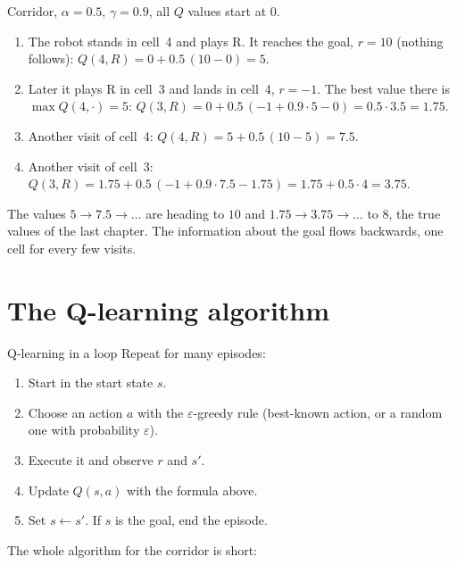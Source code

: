 \begin{example}
Corridor, $\alpha=0.5$, $\gamma=0.9$, all $Q$ values start at $0$.
\begin{enumerate}[nosep]
  \item The robot stands in cell~4 and plays R. It reaches the goal, $r=10$ (nothing follows): $Q(4,R)=0+0.5\,(10-0)=5$.
  \item Later it plays R in cell~3 and lands in cell~4, $r=-1$. The best value there is $\max Q(4,\cdot)=5$: $Q(3,R)=0+0.5\,(-1+0.9\cdot5-0)=0.5\cdot3.5=1.75$.
  \item Another visit of cell~4: $Q(4,R)=5+0.5\,(10-5)=7.5$.
  \item Another visit of cell~3: $Q(3,R)=1.75+0.5\,(-1+0.9\cdot7.5-1.75)=1.75+0.5\cdot4=3.75$.
\end{enumerate}
The values $5\to7.5\to\dots$ are heading to $10$ and $1.75\to3.75\to\dots$ to $8$, the true values of the last chapter. The information about the goal flows backwards, one cell for every few visits.
\end{example}

\section*{The Q-learning algorithm}
\begin{stepbox}{Q-learning in a loop}
Repeat for many episodes:
\begin{enumerate}[nosep]
  \item Start in the start state $s$.
  \item Choose an action $a$ with the $\varepsilon$-greedy rule (best-known action, or a random one with probability $\varepsilon$).
  \item Execute it and observe $r$ and $s'$.
  \item Update $Q(s,a)$ with the formula above.
  \item Set $s\leftarrow s'$. If $s$ is the goal, end the episode.
\end{enumerate}
\end{stepbox}

The whole algorithm for the corridor is short:

